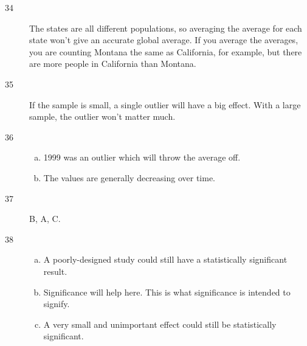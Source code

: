 \documentclass[letterpaper]{exam}
\begin{document}
    \begin{description}

      \item[34] 

        The states are all different populations, so averaging the average for
        each state won't give an accurate global average. If you average the
        averages, you are counting Montana the same as California, for example,
        but there are more people in California than Montana.

      \item[35] If the sample is small, a single outlier will have a big effect.
        With a large sample, the outlier won't matter much. 

      \item[36] 
        \begin{enumerate}[(a)]
          \item 1999 was an outlier which will throw the average off.
          \item The values are generally decreasing over time.
        \end{enumerate}

      \item[37] B, A, C.


      \item[38]
        \begin{enumerate}[(a)]
          \item A poorly-designed study could still have a statistically
            significant result.

          \item Significance will help here. This is what significance is
            intended to signify.

          \item A very small and unimportant effect could still be statistically
            significant.

        \end{enumerate}


\end{description}
\end{document}
